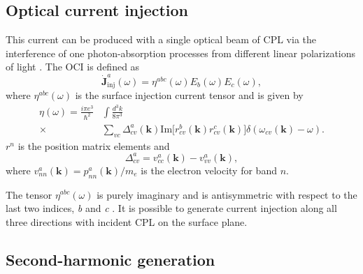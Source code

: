 \documentclass[pss]{wiley2sp} %
\begin{document}
\begin{changed}
\subsection{Optical current injection}

This current can be produced with a single optical beam of CPL via the interference of one photon-absorption processes from different linear polarizations of light \cite{sipe2000second}. The  OCI is defined as
\begin{equation}
\mathbf{\dot{J}}^{a}_{\text{inj}}(\omega) =
\eta^{abc}(\omega)E_{b}(\omega)E_{c}(\omega), \label{eq:eta}
\end{equation}
where $\eta^{abc}(\omega)$ is the surface injection current tensor and is given by
\begin{align*}
\eta(\omega) =  \frac{i\pi e^{3}}{\hbar^{2}}&\int\frac{d^{3}k}{8\pi^{3}}
\nonumber \\
\times &
\sum_{vc}\Delta^{a}_{cv}(\mathbf{k})\text{Im}\big[r^{b}_{cv}(\mathbf{k})
r^{c}_{cv}(\mathbf{k})\big]\delta(\omega_{cv}(\mathbf{k})-\omega).
\end{align*}
$r^{n}$ is the position matrix elements and 
\begin{equation*}
\Delta^{a}_{cv} = v^{a}_{cc}(\mathbf{k})-v^{a}_{vv}(\mathbf{k}),
\end{equation*}
where $v^{a}_{nn}(\mathbf{k})=p^{a}_{nn}(\mathbf{k})/m_{e}$ is the electron velocity for band $n$.

The tensor $\eta^{abc}(\omega)$ is purely imaginary and is antisymmetric with respect to the last two indices, \emph{b} and \emph{c} \cite{sipe2000second,nastos2006optical}. It is possible to generate current injection along all three directions with incident CPL on the surface plane.



\end{changed}


\subsection{Second-harmonic generation}
\end{document}
